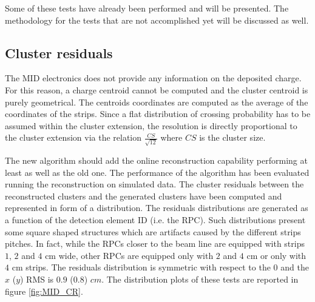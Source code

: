 Some of these tests have already been performed and will be presented.
The methodology for the tests that are not accomplished yet will be discussed as well.

\subsection{Cluster residuals}

The MID electronics does not provide any information on the deposited charge. 
For this reason, a charge centroid cannot be computed and the cluster centroid is purely geometrical.
The centroids coordinates are computed as the average of the coordinates of the strips.
Since a flat distribution of crossing probability has to be assumed within the cluster extension, the resolution is directly proportional to the cluster extension via the relation $\frac{CS}{\sqrt{12}}$ where $CS$ is the cluster size.

The new algorithm should add the online reconstruction capability performing at least as well as the old one.
The performance of the algorithm has been evaluated running the reconstruction on simulated data.
The cluster residuals between the reconstructed clusters and the generated clusters have been computed and represented in form of a distribution.
The residuals distributions are generated as a function of the detection element ID (i.e. the RPC).
Such distributions present some square shaped structures which are artifacts caused by the different strips pitches.
In fact, while the RPCs closer to the beam line are equipped with strips $1$, $2$ and $4$ cm wide, other RPCs are equipped only with $2$ and $4$ cm or only with $4$ cm strips.
The residuals distribution is symmetric with respect to the $0$ and the $x$ ($y$) RMS is $0.9$ ($0.8$) $cm$.
The distribution plots of these tests are reported in figure \ref{fig:MID_CR}.

